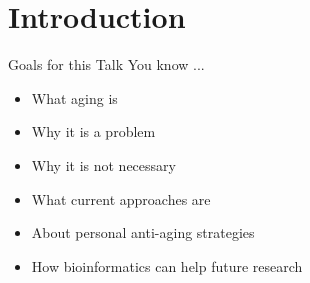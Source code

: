 \section{Introduction}

\begin{frame}[c]{Goals for this Talk}
    \large
    You know ...
    \begin{itemize}[<+(1)->]
        \item What aging is
        \item Why it is a problem
        \item Why it is not necessary
        \item What current approaches are
        \item About personal anti-aging strategies
        \item How bioinformatics can help future research
    \end{itemize}
\end{frame}
